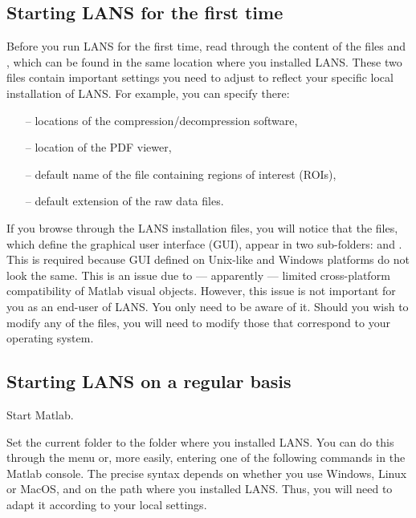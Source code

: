 
\subsection{Starting LANS for the first time}
\setcounter{step}{0}

Before you run LANS for the first time, read through the content of the files  and , which can be found in the same location where you installed LANS. These two files contain important settings you need to adjust to reflect your specific local installation of LANS. For example, you can specify there:

\begin{itemize}%
\item[--] locations of the compression/decompression software,
\item[--] location of the PDF viewer,
\item[--] default name of the file containing regions of interest (ROIs),
\item[--] default extension of the raw data files.
\end{itemize}

\nb\bul
If you browse through the LANS installation files, you will notice that the  files, which define the graphical user interface (GUI), appear in two sub-folders:  and . This is required because GUI defined on Unix-like and Windows platforms do not look the same. This is an issue due to --- apparently --- limited cross-platform compatibility of Matlab visual objects. However, this issue is not important for you as an end-user of LANS. You only need to be aware of it. Should you wish to modify any of the  files, you will need to modify those that correspond to your operating system.


\subsection{Starting LANS on a regular basis}
\setcounter{step}{0}

\s Start Matlab.

\s Set the current folder to the folder where you installed LANS. You can do this through the menu or, more easily, entering one of the following commands in the Matlab console. The precise syntax depends on whether you use Windows, Linux or MacOS, and on the path where you installed LANS. Thus, you will need to adapt it according to your local settings.


